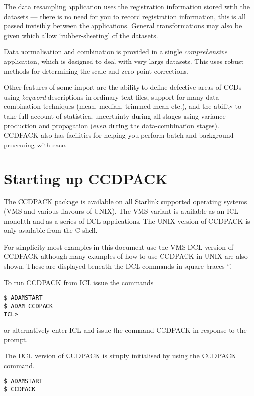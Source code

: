 The data resampling application uses the registration information 
stored with the datasets --- there is no need for you to record
registration information, this is all passed invisibly between the
applications. General transformations may also be given which allow
`rubber-sheeting' of the datasets.

Data normalisation and combination is provided in a single {\em
comprehensive} application, which is designed to deal with very large
datasets. This uses robust methods for determining the scale and zero
point corrections.

Other features of some import are the ability to define defective areas
of CCDs using {\em keyword } descriptions in ordinary text files, 
support for many data-combination techniques (mean, median, trimmed mean
etc.), and the ability to take full account of statistical uncertainty
during all stages using variance production and propagation ({\em even}
during the data-combination stages). CCDPACK also has facilities for
helping you perform batch and background  processing with ease.

\section{Starting up CCDPACK}

The CCDPACK package is available on all Starlink supported operating
systems (VMS and various flavours of UNIX). The VMS variant is available
as an ICL monolith and as a series of DCL applications. The UNIX version
of CCDPACK is only available from the C shell.

For simplicity most examples in this document use the VMS DCL version 
of CCDPACK although many examples of how to use CCDPACK in UNIX are 
also shown. These are displayed beneath the DCL commands in square 
braces `\myverb{[ ]}'.

To run CCDPACK from ICL issue the commands

\begin{myquote}
\begin{verbatim}
$ ADAMSTART
$ ADAM CCDPACK
ICL>
\end{verbatim}
\end{myquote}

or alternatively enter ICL and issue the command CCDPACK in response to
the prompt.

The DCL version of CCDPACK is simply initialised by using the CCDPACK
command.
\begin{myquote}
\begin{verbatim}
$ ADAMSTART
$ CCDPACK
\end{verbatim}
\end{myquote}


